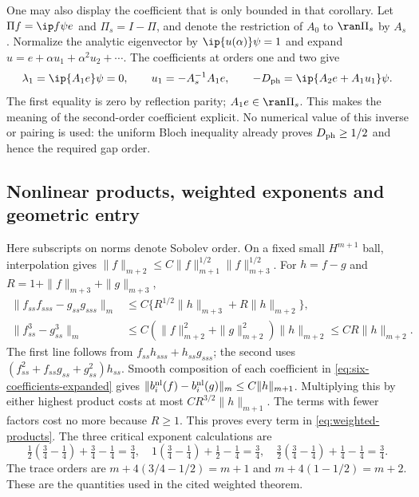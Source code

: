 One may also display the coefficient that is only bounded in that corollary.
Let $\Pi f=\ip f\psi e$ and $\Pi_s=I-\Pi$, and denote the restriction of
$A_0$ to $\ran\Pi_s$ by $A_s$. Normalize the analytic eigenvector by
$\ip{u(\alpha)}\psi=1$ and expand $u=e+\alpha u_1+\alpha^2u_2+\cdots$.
The coefficients at orders one and two give
\[
 \lambda_1=\ip{A_1e}\psi=0,\qquad u_1=-A_s^{-1}A_1e,
 \qquad -D_{\rm ph}=\ip{A_2e+A_1u_1}\psi.
\]
The first equality is zero by reflection parity; $A_1e\in\ran\Pi_s$.
This makes the meaning of the second-order coefficient explicit. No numerical
value of this inverse or pairing is used: the uniform Bloch inequality
already proves $D_{\rm ph}\ge1/2$ and hence the required gap order.

\subsection{Nonlinear products, weighted exponents and geometric entry}
Here subscripts on norms denote Sobolev order. On a fixed small
$H^{m+1}$ ball, interpolation gives
$\|f\|_{m+2}\le C\|f\|_{m+1}^{1/2}\|f\|_{m+3}^{1/2}$.
For $h=f-g$ and $R=1+\|f\|_{m+3}+\|g\|_{m+3}$,
\begin{align*}
 \|f_{ss}f_{sss}-g_{ss}g_{sss}\|_m
 &\le C\{R^{1/2}\|h\|_{m+3}+R\|h\|_{m+2}\},\\
 \|f_{ss}^3-g_{ss}^3\|_m
 &\le C(\|f\|_{m+2}^2+\|g\|_{m+2}^2)\|h\|_{m+2}
 \le CR\|h\|_{m+2}.
\end{align*}
The first line follows from
$f_{ss}h_{sss}+h_{ss}g_{sss}$; the second uses
$(f_{ss}^2+f_{ss}g_{ss}+g_{ss}^2)h_{ss}$.
Smooth composition of each coefficient in
\eqref{eq:six-coefficients-expanded} gives
$\|b_i^{\rm nl}(f)-b_i^{\rm nl}(g)\|_m\le C\|h\|_{m+1}$.
Multiplying this by either highest product costs at most
$CR^{3/2}\|h\|_{m+1}$. The terms with fewer factors cost no more because
$R\ge1$. This proves every term in \eqref{eq:weighted-products}.
The three critical exponent calculations are
\[
 \tfrac12(\tfrac34-\tfrac14)+\tfrac34-\tfrac14=\tfrac34,
 \quad 1(\tfrac34-\tfrac14)+\tfrac12-\tfrac14=\tfrac34,
 \quad \tfrac32(\tfrac34-\tfrac14)+\tfrac14-\tfrac14=\tfrac34.
\]
The trace orders are $m+4(3/4-1/2)=m+1$ and
$m+4(1-1/2)=m+2$. These are the quantities used in the cited weighted theorem.

